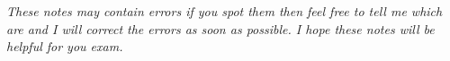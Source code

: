 \begin{center}
    \textit{These notes may contain errors if you spot them then feel free to tell me which are and I will correct the errors as soon as possible. I hope these notes will be helpful for you exam.}
\end{center}
\tableofcontents
\clearpage

